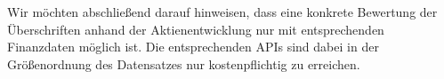 Wir möchten abschließend darauf hinweisen, dass eine konkrete Bewertung der Überschriften anhand der Aktienentwicklung nur mit entsprechenden Finanzdaten möglich ist. Die entsprechenden APIs sind dabei in der Größenordnung des Datensatzes nur kostenpflichtig zu erreichen.

\citep[see][]{yahoofinance} \citep[see][]{econ_topicmodelling}
